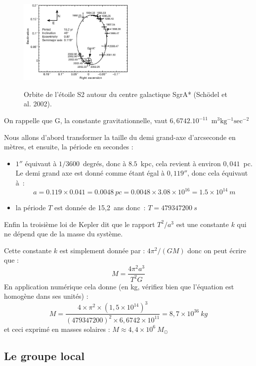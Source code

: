 \documentclass[a4paper,10pt]{report}
\renewcommand{\u}[1]{\ensuremath{\mathrm{#1}}} %
\begin{document}
\begin{figure}[htp]
  \centering
  \includegraphics[width=0.5\textwidth]{nature01121-f2_2}
  \label{centregalac}
  \caption{Orbite de l'étoile S2 autour du centre galactique SgrA*
    (Schödel et al. 2002).}
\end{figure}

\begin{Answer}
  On rappelle que G, la constante gravitationnelle, vaut
  $6,6742.10^{-11}$~\u{m^3kg^{-1}sec^{-2}}

  Nous allons d'abord transformer la taille du demi grand-axe
  d'arcseconde en mètres, et ensuite, la période en secondes :
  \begin{itemize}
  \item $1''$ équivaut à $1/3600$~degrés, donc à $8.5$~kpc, cela
    revient à environ $0,041$~pc. Le demi grand axe est donné comme
    étant égal à $0,119''$, donc cela équivaut à~:
    $$
    a = 0.119\times0.041 = 0.0048~pc = 0.0048\times 3.08 \times
    10^{16} = 1.5 \times 10^{14}~m
    $$

  \item la période $T$ est donnée de 15,2~ans donc~: $T=479347200~s$
  \end{itemize}

  Enfin la troisième loi de Kepler dit que le rapport $T^2/a^3$ est une
  constante $k$ qui ne dépend que de la masse du système.

  Cette constante $k$ est simplement donnée par : $4\pi^2/(GM)$ donc on
  peut écrire que :
  $$
  M = \frac{4\pi^2 a^3}{T^2 G}
  $$
  En application numérique cela donne (en kg, vérifiez bien que
  l'équation est homogène dans ses unités) :
  $$
  M = \frac{ 4 \times \pi^2 \times (1,5 \times 10^{14})^3 } { (479 347
    200)^2 \times 6,6742 \times 10^{11} } = 8,7 \times 10^{36}~kg
  $$
  et ceci exprimé en masses solaires : $M \approx 4,4 \times
  10^6~M_{\odot}$
\end{Answer}

\subsection{Le groupe local}
\end{document}
